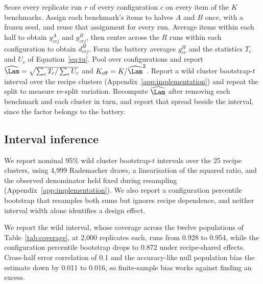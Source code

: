 \begin{algorithm}[t]
\caption{SNAP measurement recipe for a fixed battery of $K$ benchmarks scored on $R$ replicate runs per configuration. The primary analysis used a random frozen split, checked against a passage-aware one, and the registered test kept passage-linked items in one half.}
\label{alg:snap}
\begin{algorithmic}[1]
\STATE Score every replicate run $r$ of every configuration $c$ on every item of the $K$ benchmarks.
\STATE Assign each benchmark's items to halves $A$ and $B$ once, with a frozen seed, and reuse that assignment for every run.
\STATE Average items within each half to obtain $y^A_{crj}$ and $y^B_{crj}$, then centre across the $R$ runs within each configuration to obtain $d^H_{crj}$.
\STATE Form the battery averages $g^H_{cr}$ and the statistics $T_c$ and $U_c$ of Equation~\ref{eq:tu}.
\STATE Pool over configurations and report $\widehat\Lam=\sqrt{\sum_c T_c/\sum_c U_c}$ and $K_{\mathrm{eff}}=K/\widehat\Lam^2$.
\STATE Report a wild cluster bootstrap-$t$ interval over the recipe clusters (Appendix~\ref{app:implementation}) and repeat the split to measure re-split variation.
\STATE Recompute $\widehat\Lam$ after removing each benchmark and each cluster in turn, and report that spread beside the interval, since the factor belongs to the battery.
\end{algorithmic}
\end{algorithm}


\subsection{Interval inference}
We report nominal 95\% wild cluster bootstrap-$t$ intervals over the 25 recipe clusters, using 4,999 Rademacher draws, a linearisation of the squared ratio, and the observed denominator held fixed during resampling (Appendix~\ref{app:implementation}). We also report a configuration percentile bootstrap that resamples both sums but ignores recipe dependence, and neither interval width alone identifies a design effect.

We report the wild interval, whose coverage across the twelve populations of Table~\ref{tab:coverage}, at 2,000 replicates each, runs from 0.928 to 0.954, while the configuration percentile bootstrap drops to 0.872 under recipe-shared effects. Cross-half error correlation of 0.1 and the accuracy-like null population bias the estimate down by 0.011 to 0.016, so finite-sample bias works against finding an excess.

